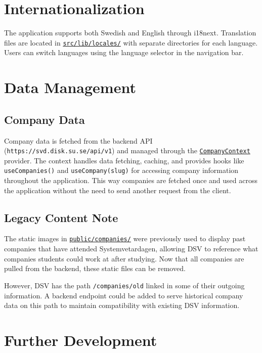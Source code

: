 \documentclass[a4paper,10pt,oneside]{article}
\begin{document}
\section{Internationalization}

The application supports both Swedish and English through i18next. Translation files are located in \href{https://github.com/Systemvetardagen/Systemvetardagen/tree/main/src/lib/locales}{\texttt{src/lib/locales/}} with separate directories for each language. Users can switch languages using the language selector in the navigation bar.

\section{Data Management}

\subsection{Company Data}
Company data is fetched from the backend API (\texttt{https://svd.disk.su.se/api/v1}) and managed through the \href{https://github.com/Systemvetardagen/Systemvetardagen/blob/main/src/lib/context/CompanyContext.tsx}{\texttt{CompanyContext}} provider. The context handles data fetching, caching, and provides hooks like \texttt{useCompanies()} and \texttt{useCompany(slug)} for accessing company information throughout the application. This way companies are fetched once and used across the application without the need to send another request from the client.


\subsection{Legacy Content Note}
The static images in \href{https://github.com/Systemvetardagen/Systemvetardagen/tree/main/public/companies}{\texttt{public/companies/}} were previously used to display past companies that have attended Systemvetardagen, allowing DSV to reference what companies students could work at after studying. Now that all companies are pulled from the backend, these static files can be removed. 

However, DSV has the path \texttt{/companies/old} linked in some of their outgoing information. A backend endpoint could be added to serve historical company data on this path to maintain compatibility with existing DSV information.

\section{Further Development}
\end{document}

